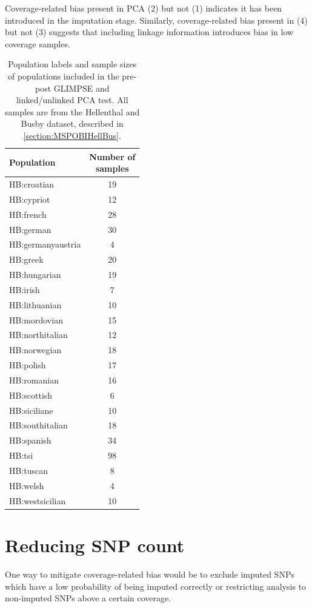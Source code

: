 {Coverage-related bias present in PCA (2) but not (1) indicates it has been introduced in the imputation stage. Similarly, coverage-related bias present in (4) but not (3) suggests that including linkage information introduces bias in low coverage samples. 


\begin{table}
\centering
\begin{tabular}[t]{lc}
\toprule
Population & \thead{Number of\\ samples}\\
\midrule
HB:croatian & 19\\
HB:cypriot & 12\\
HB:french & 28\\
HB:german & 30\\
HB:germanyaustria & 4\\
HB:greek & 20\\
HB:hungarian & 19\\
HB:irish & 7\\
HB:lithuanian & 10\\
HB:mordovian & 15\\
HB:northitalian & 12\\
HB:norwegian & 18\\
HB:polish & 17\\
HB:romanian & 16\\
HB:scottish & 6\\
HB:siciliane & 10\\
HB:southitalian & 18\\
HB:spanish & 34\\
HB:tsi & 98\\
HB:tuscan & 8\\
HB:welsh & 4\\
HB:westsicilian & 10\\
\bottomrule
\end{tabular}
\caption{Population labels and sample sizes of populations included in the pre-post GLIMPSE and linked/unlinked PCA test. All samples are from the Hellenthal and Busby dataset, described in \ref{section:MSPOBIHellBus}.}
\label{tab:HB_pops}
\end{table}


\section{Reducing SNP count} \label{sec:ReducingSNPcount}

One way to mitigate coverage-related bias would be to exclude imputed SNPs which have a low probability of being imputed correctly or restricting analysis to non-imputed SNPs above a certain coverage.

}
